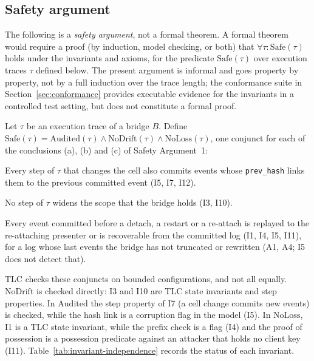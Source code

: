 \subsection{Safety argument}\label{sec:safety-argument}

The following is a \emph{safety argument}, not a formal theorem. A
formal theorem would require a proof (by induction, model checking, or
both) that $\forall \tau: \mathrm{Safe}(\tau)$ holds under the
invariants and axioms, for the predicate $\mathrm{Safe}(\tau)$ over
execution traces $\tau$ defined below. The
present argument is informal and goes property by property, not by a
full induction over the trace length;
the conformance suite in Section~\ref{sec:conformance} provides
executable evidence for the invariants in a controlled test setting,
but does not constitute a formal proof.

Let $\tau$ be an execution trace of a bridge $B$. Define
$\mathrm{Safe}(\tau) = \mathrm{Audited}(\tau) \wedge
\mathrm{NoDrift}(\tau) \wedge \mathrm{NoLoss}(\tau)$, one conjunct for
each of the conclusions (a), (b) and (c) of Safety Argument~1:
\begin{description}[leftmargin=2em]
\item[$\mathrm{Audited}(\tau)$.] Every step of $\tau$ that changes the
cell also commits events whose \texttt{prev\_hash} links them to the
previous committed event (I5, I7, I12).
\item[$\mathrm{NoDrift}(\tau)$.] No step of $\tau$ widens the scope
that the bridge holds (I3, I10).
\item[$\mathrm{NoLoss}(\tau)$.] Every event committed before a detach, a
restart or a re-attach is replayed to the re-attaching presenter or is
recoverable from the committed log (I1, I4, I5, I11), for a log whose
last events the bridge has not truncated or rewritten (A1, A4; I5 does not
detect that).
\end{description}
TLC checks these conjuncts on bounded configurations, and not all
equally. $\mathrm{NoDrift}$ is checked directly: I3 and I10 are TLC state
invariants and step properties. In $\mathrm{Audited}$ the step property
of I7 (a cell change commits new events) is checked, while the hash
link is a corruption flag in the model (I5). In $\mathrm{NoLoss}$, I1 is a
TLC state invariant, while the prefix check is a flag (I4) and the proof of
possession is a possession predicate against an attacker that holds no client
key (I11). Table~\ref{tab:invariant-independence} records the
status of each invariant.

